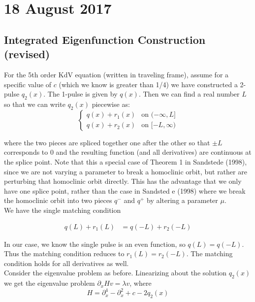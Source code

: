 \documentclass[12pt]{article}
\begin{document}
\section*{18 August 2017}

\subsection*{Integrated Eigenfunction Construction (revised)}
For the 5th order KdV equation (written in traveling frame), assume for a specific value of $c$ (which we know is greater than 1/4) we have constructed a 2-pulse $q_2(x)$. The 1-pulse is given by $q(x)$. Then we can find a real number $L$ so that we can write $q_2(x)$ piecewise as:
\begin{equation}\label{q2piecewise}
\begin{cases}
q(x) + r_1(x) & \text{on } (-\infty, L] \\
q(x) + r_2(x) & \text{on } [-L, \infty)
\end{cases}
\end{equation}

where the two pieces are spliced together one after the other so that $\pm L$ corresponds to 0 and the resulting function (and all derivatives) are continuous at the splice point. Note that this a special case of Theorem 1 in Sandstede (1998), since we are not varying a parameter to break a homoclinic orbit, but rather are perturbing that homoclinic orbit directly. This has the advantage that we only have one splice point, rather than the case in Sandsted e (1998) where we break the homoclinic orbit into two pieces $q^-$ and $q^+$ by altering a parameter $\mu$.
\\

We have the single matching condition

\begin{align*}
q(L) + r_1(L) &= q(-L) + r_2(-L)
\end{align*}

In our case, we know the single pulse is an even function, so $q(L) = q(-L)$. Thus the matching condition reduces to $r_1(L) = r_2(-L)$. The matching condition holds for all derivatives as well. \\

Consider the eigenvalue problem as before. Linearizing about the solution $q_2(x)$ we get the eigenvalue problem $\partial_x H v = \lambda v$, where 
\begin{equation}\label{hamiltonian}
H = \partial_x^4 - \partial_x^2 + c - 2 q_2(x)
\end{equation}
\end{document}
